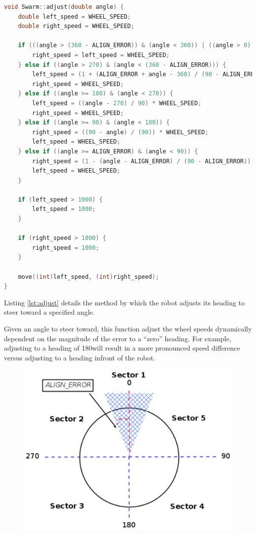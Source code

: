\begin{lstlisting}[language=C++, caption={Adjust heading},label={lst:adjust}]
void Swarm::adjust(double angle) {
	double left_speed = WHEEL_SPEED;
	double right_speed = WHEEL_SPEED;
	
	if (((angle > (360 - ALIGN_ERROR)) & (angle < 360)) | ((angle > 0) & (angle < ALIGN_ERROR))) {
		right_speed = left_speed = WHEEL_SPEED;
	} else if ((angle > 270) & (angle < (360 - ALIGN_ERROR))) {
		left_speed = (1 + (ALIGN_ERROR + angle - 360) / (90 - ALIGN_ERROR)) * WHEEL_SPEED;
		right_speed = WHEEL_SPEED;
	} else if ((angle >= 180) & (angle < 270)) {
		left_speed = ((angle - 270) / 90) * WHEEL_SPEED;
		right_speed = WHEEL_SPEED;
	} else if ((angle >= 90) & (angle < 180)) {
		right_speed = ((90 - angle) / (90)) * WHEEL_SPEED;
		left_speed = WHEEL_SPEED;
	} else if ((angle >= ALIGN_ERROR) & (angle < 90)) {
		right_speed = (1 - (angle - ALIGN_ERROR) / (90 - ALIGN_ERROR)) * WHEEL_SPEED;
		left_speed = WHEEL_SPEED;
	}
	
	if (left_speed > 1000) {
		left_speed = 1000;
	}
	
	if (right_speed > 1000) {
		right_speed = 1000;
	}
	
	move((int)left_speed, (int)right_speed);
}
\end{lstlisting}

Listing \ref{lst:adjust} details the method by which the robot adjusts its heading to steer toward a specified angle. 

Given an angle to steer toward, this function adjust the wheel speeds dynamically dependent on the magnitude of the error to a ``zero'' heading. For example, adjusting to a heading of 180\textdegree will result in a more pronounced speed difference versus adjusting to a heading infront of the robot.

\begin{figure}[h]
	\centering
	\begin{minipage}{.75\textwidth}
		\centering
		\includegraphics[width=1\linewidth]{sections_robot}
		\label{fig:robot-sectors}
	\end{minipage}
\end{figure}

